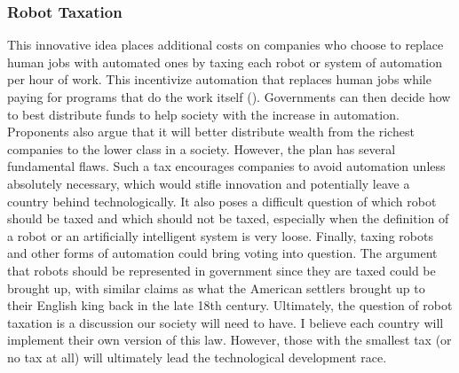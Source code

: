 \subsubsection{Robot Taxation} 
This innovative idea places additional costs on companies who choose to replace human jobs with automated ones by taxing each robot or system of automation per hour of work. This incentivize automation that replaces human jobs while paying for programs that do the work itself (\cite{abbottShouldRobotsPayTaxes}). Governments can then decide how to best distribute funds to help society with the increase in automation. Proponents also argue that it will better distribute wealth from the richest companies to the lower class in a society. However, the plan has several fundamental flaws. Such a tax encourages companies to avoid automation unless absolutely necessary, which would stifle innovation and potentially leave a country behind technologically. It also poses a difficult question of which robot should be taxed and which should not be taxed, especially when the definition of a robot or an artificially intelligent system is very loose. Finally, taxing robots and other forms of automation could bring voting into question. The argument that robots should be represented in government since they are taxed could be brought up, with similar claims as what the American settlers brought up to their English king back in the late 18th century. Ultimately, the question of robot taxation is a discussion our society will need to have. I believe each country will implement their own version of this law. However, those with the smallest tax (or no tax at all) will ultimately lead the technological development race.

